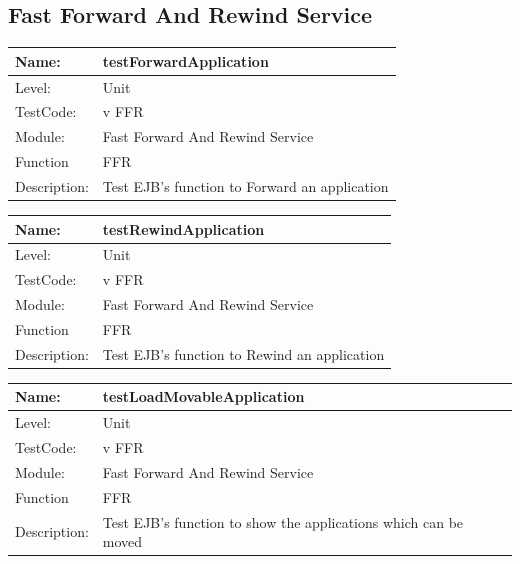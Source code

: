 \documentclass[12pt]{article}
\begin{document}
\begin{flushleft}
\subsection{Fast Forward And Rewind Service}

\begin{center}
\begin{tabular}{|l|p{12cm}|}
\hline

 Name: & testForwardApplication  \\
\hline
Level: & Unit \\
\hline
TestCode: & v FFR \\
\hline
Module:& Fast Forward And Rewind Service \\
\hline
Function & FFR \\
\hline
Description: & Test EJB's function to Forward an application\\
\hline
\end{tabular}
\end{center}

\begin{center}
\begin{tabular}{|l|p{12cm}|}
\hline

 Name: & testRewindApplication  \\
\hline
Level: & Unit \\
\hline
TestCode: & v FFR \\
\hline
Module:& Fast Forward And Rewind Service \\
\hline
Function & FFR \\
\hline
Description: & Test EJB's function to Rewind an application\\
\hline
\end{tabular}
\end{center}

\begin{center}
\begin{tabular}{|l|p{12cm}|}
\hline

 Name: & testLoadMovableApplication  \\
\hline
Level: & Unit \\
\hline
TestCode: & v FFR \\
\hline
Module:& Fast Forward And Rewind Service \\
\hline
Function & FFR \\
\hline
Description: & Test EJB's function to show the applications which can be moved\\
\hline
\end{tabular}
\end{center}


\end{flushleft}
\end{document}
